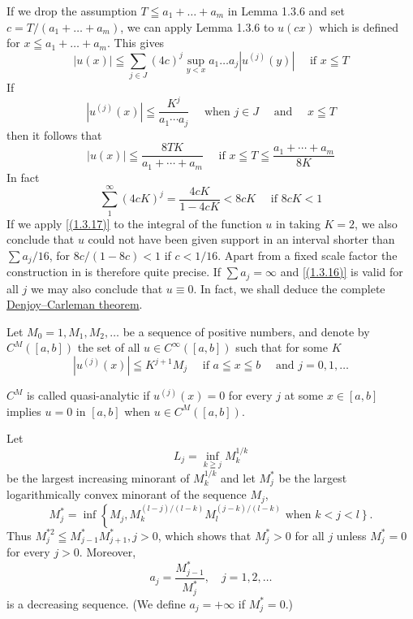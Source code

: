 If we drop the assumption $T \leqq a_{1}+\ldots+a_{m}$ in Lemma 1.3.6 and set $c=T /\left(a_{1}+\ldots+a_{m}\right)$, we can apply Lemma 1.3.6 to $u(c x)$ which is defined for $x \leqq a_{1}+\ldots+a_{m}$. This gives
\begin{equation}
    \label{(1.3.13)'}
	|u(x)| \leqq \sum_{j \in J}(4 c)^{j} \sup _{y<x} a_{1} \ldots a_{j}\left|u^{(j)}(y)\right| \quad \text { if } x \leqq T
\end{equation}
If
\begin{equation}
    \label{(1.3.16)}
    \left|u^{(j)}(x)\right| \leqq \frac{K^j}{a_{1} \cdots a_{j}}\quad \text{ when } j \in J \quad \text{ and }\quad x \leqq T
\end{equation}
then it follows that
\begin{equation}
    \label{(1.3.17)}
	|u(x)| \leqq \frac{8TK}{a_{1}+\cdots+a_{m}} \quad \text { if } x \leqq T \leqq \frac{a_{1}+\cdots+a_{m}}{8 K}
\end{equation}
In fact
\[
	\sum_{1}^{\infty}(4 c K)^{j}=\frac{4cK}{1-4 c K}<8 c K \quad \text { if } 8 c K<1
\]
If we apply \eqref{(1.3.17)} to the integral of the function $u$ in  taking $K=2$, we also conclude that $u$ could not have been given support in an interval shorter than $\sum a_{j} / 16$, for $8 c /(1-8 c)<1$ if $c<1 / 16$. Apart from a fixed scale factor the construction in  is therefore quite precise. If $\sum a_{j}=\infty$ and \eqref{(1.3.16)} is valid for all $j$ we may also conclude that $u \equiv 0$. In fact, we shall deduce the complete \hyperref[thm:1.3.8]{Denjoy--Carleman theorem}.

Let $M_{0}=1, M_{1}, M_{2}, \ldots$ be a sequence of positive numbers, and denote by $C^{M}([a, b])$ the set of all $u \in C^{\infty}([a, b])$ such that for some $K$
\begin{equation}
    \label{(1.3.18)}
    \left|u^{(j)}(x)\right| \leqq K^{j+1} M_{j} \quad \text{ if } a \leqq x \leqq b \quad \text{ and }j=0,1, \ldots
\end{equation}
\begin{defi}
    $C^{M}$ is called quasi-analytic if $u^{(j)}(x)=0$ for every $j$ at some $x \in[a, b]$ implies $u=0$ in $[a, b]$ when $u \in C^{M}([a, b])$.
\end{defi}
Let
\begin{equation}
    \label{1.3.19}
	L_{j}=\inf _{k \geqq j} M_{k}^{1 / k}
\end{equation}
be the largest increasing minorant of $M_{k}^{1 / k}$ and let $M_{j}^{*}$ be the largest logarithmically convex minorant of the sequence $M_{j}$,
\begin{equation}
    \label{(1.3.20)}
    M_{j}^{*}=\inf \left\{M_{j}, M_{k}^{(l-j) /(l-k)} M_{l}^{(j-k) /(l-k)}\right. \text{ when } \left.k<j<l\right\}.
\end{equation}
Thus $M_{j}^{* 2} \leqq M_{j-1}^{*} M_{j+1}^{*}, j>0$, which shows that $M_{j}^{*}>0$ for all $j$ unless $M_{j}^{*}=0$ for every $j>0$. Moreover,
\begin{equation}
    \label{(1.3.21)}
    a_{j}= \frac{M_{j-1}^{*}}{M_{j}^{*}}, \quad j=1,2, \ldots
\end{equation}
is a decreasing sequence. (We define $a_{j}=+\infty$ if $M_{j}^{*}=0$.)

